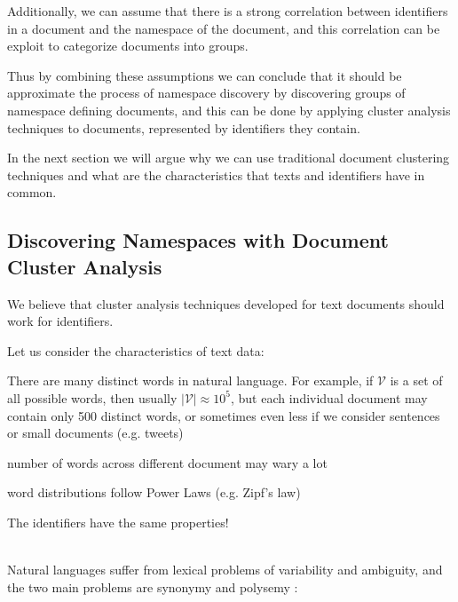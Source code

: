 Additionally, we can assume that there is a strong correlation
between identifiers in a document and the namespace of the document,
and this correlation can be exploit to categorize
documents into groups.




Thus by combining these assumptions we can conclude that it should
be approximate the process of namespace discovery by discovering
groups of namespace defining documents, and this can be done by
applying cluster analysis techniques to documents, represented
by identifiers they contain.

In the next section we will argue why we can use traditional
document clustering techniques and what are the characteristics
that texts and identifiers have in common.


\subsection{Discovering Namespaces with Document Cluster Analysis} \label{sec:clusters-namespaces}


We believe that cluster analysis techniques developed for
text documents should work for identifiers.

Let us consider the characteristics of text data:

There are many distinct words in natural language. For example,
if $\mathcal V$ is a set of all possible words, then usually $|\mathcal V| \approx 10^5$,
but each individual document may contain only 500 distinct words, or
sometimes even less if we consider sentences or small documents
(e.g. tweets)

number of words across different document may wary a lot

 word distributions follow Power Laws (e.g. Zipf's law)


The identifiers have the same properties! 

\ \\


Natural languages suffer from lexical problems of variability and ambiguity,
and the two main problems are synonymy and polysemy \cite{deerwester1990indexing}
\cite{gliozzo2009semantic}:


